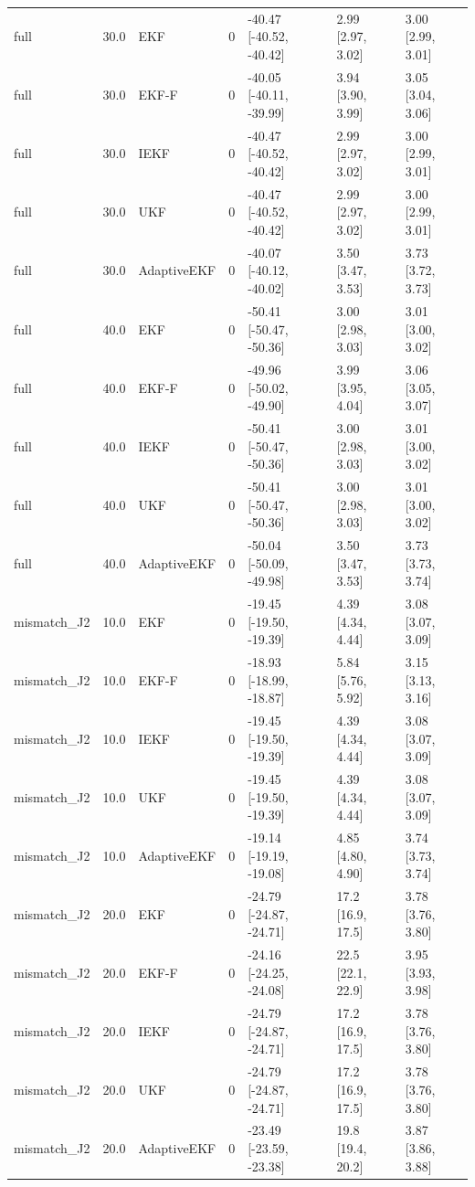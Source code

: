 {\begin{longtable}{lllllll}
full & 30.0 & EKF & 0 & -40.47 [-40.52, -40.42] & 2.99 [2.97, 3.02] & 3.00 [2.99, 3.01] \\
full & 30.0 & EKF-F & 0 & -40.05 [-40.11, -39.99] & 3.94 [3.90, 3.99] & 3.05 [3.04, 3.06] \\
full & 30.0 & IEKF & 0 & -40.47 [-40.52, -40.42] & 2.99 [2.97, 3.02] & 3.00 [2.99, 3.01] \\
full & 30.0 & UKF & 0 & -40.47 [-40.52, -40.42] & 2.99 [2.97, 3.02] & 3.00 [2.99, 3.01] \\
full & 30.0 & AdaptiveEKF & 0 & -40.07 [-40.12, -40.02] & 3.50 [3.47, 3.53] & 3.73 [3.72, 3.73] \\
full & 40.0 & EKF & 0 & -50.41 [-50.47, -50.36] & 3.00 [2.98, 3.03] & 3.01 [3.00, 3.02] \\
full & 40.0 & EKF-F & 0 & -49.96 [-50.02, -49.90] & 3.99 [3.95, 4.04] & 3.06 [3.05, 3.07] \\
full & 40.0 & IEKF & 0 & -50.41 [-50.47, -50.36] & 3.00 [2.98, 3.03] & 3.01 [3.00, 3.02] \\
full & 40.0 & UKF & 0 & -50.41 [-50.47, -50.36] & 3.00 [2.98, 3.03] & 3.01 [3.00, 3.02] \\
full & 40.0 & AdaptiveEKF & 0 & -50.04 [-50.09, -49.98] & 3.50 [3.47, 3.53] & 3.73 [3.73, 3.74] \\
mismatch\_J2 & 10.0 & EKF & 0 & -19.45 [-19.50, -19.39] & 4.39 [4.34, 4.44] & 3.08 [3.07, 3.09] \\
mismatch\_J2 & 10.0 & EKF-F & 0 & -18.93 [-18.99, -18.87] & 5.84 [5.76, 5.92] & 3.15 [3.13, 3.16] \\
mismatch\_J2 & 10.0 & IEKF & 0 & -19.45 [-19.50, -19.39] & 4.39 [4.34, 4.44] & 3.08 [3.07, 3.09] \\
mismatch\_J2 & 10.0 & UKF & 0 & -19.45 [-19.50, -19.39] & 4.39 [4.34, 4.44] & 3.08 [3.07, 3.09] \\
mismatch\_J2 & 10.0 & AdaptiveEKF & 0 & -19.14 [-19.19, -19.08] & 4.85 [4.80, 4.90] & 3.74 [3.73, 3.74] \\
mismatch\_J2 & 20.0 & EKF & 0 & -24.79 [-24.87, -24.71] & 17.2 [16.9, 17.5] & 3.78 [3.76, 3.80] \\
mismatch\_J2 & 20.0 & EKF-F & 0 & -24.16 [-24.25, -24.08] & 22.5 [22.1, 22.9] & 3.95 [3.93, 3.98] \\
mismatch\_J2 & 20.0 & IEKF & 0 & -24.79 [-24.87, -24.71] & 17.2 [16.9, 17.5] & 3.78 [3.76, 3.80] \\
mismatch\_J2 & 20.0 & UKF & 0 & -24.79 [-24.87, -24.71] & 17.2 [16.9, 17.5] & 3.78 [3.76, 3.80] \\
mismatch\_J2 & 20.0 & AdaptiveEKF & 0 & -23.49 [-23.59, -23.38] & 19.8 [19.4, 20.2] & 3.87 [3.86, 3.88] \\

\end{longtable}}
